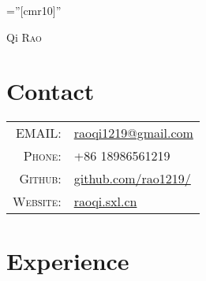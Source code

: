 \documentclass[a4paper,10pt]{article}
\begin{document}

\pagestyle{empty} %

\font\fb=''[cmr10]'' %

\par{\centering
		{\Huge Qi \textsc{Rao}
	}\bigskip\par}

\section{Contact}

\begin{tabular}{rl}
    \textsc{EMAIL:} & \href{mailto:raoqi1219@gmail.com}{raoqi1219@gmail.com}\\
    \textsc{Phone:}     & +86 18986561219\\
    \textsc{Github:}     & \href{https://github.com/rao1219/}{github.com/rao1219/} \\
    \textsc{Website:}     & \href{http://raoqi.sxl.cn/}{raoqi.sxl.cn}
\end{tabular}

\section{Experience}
\end{document}
